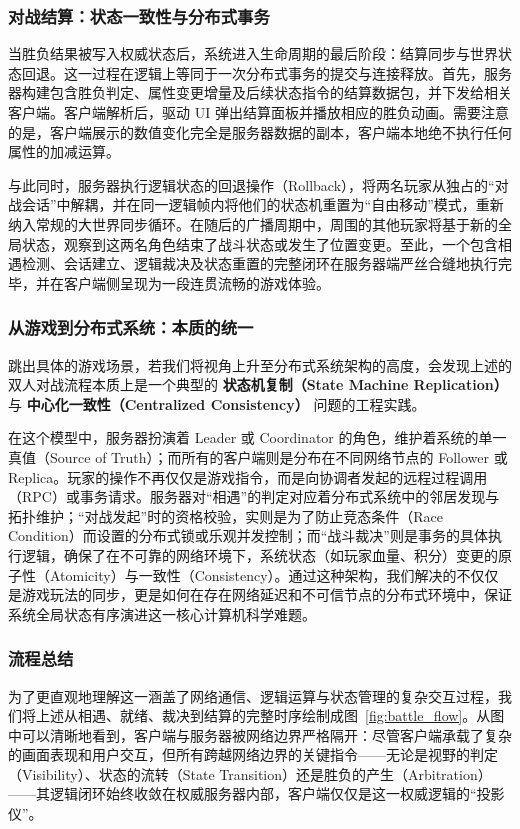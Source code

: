 \subsubsection{对战结算：状态一致性与分布式事务}

当胜负结果被写入权威状态后，系统进入生命周期的最后阶段：结算同步与世界状态回退。这一过程在逻辑上等同于一次分布式事务的提交与连接释放。首先，服务器构建包含胜负判定、属性变更增量及后续状态指令的结算数据包，并下发给相关客户端。客户端解析后，驱动 UI 弹出结算面板并播放相应的胜负动画。需要注意的是，客户端展示的数值变化完全是服务器数据的副本，客户端本地绝不执行任何属性的加减运算。

与此同时，服务器执行逻辑状态的回退操作（Rollback），将两名玩家从独占的“对战会话”中解耦，并在同一逻辑帧内将他们的状态机重置为“自由移动”模式，重新纳入常规的大世界同步循环。在随后的广播周期中，周围的其他玩家将基于新的全局状态，观察到这两名角色结束了战斗状态或发生了位置变更。至此，一个包含相遇检测、会话建立、逻辑裁决及状态重置的完整闭环在服务器端严丝合缝地执行完毕，并在客户端侧呈现为一段连贯流畅的游戏体验。

\subsubsection{从游戏到分布式系统：本质的统一}

跳出具体的游戏场景，若我们将视角上升至分布式系统架构的高度，会发现上述的双人对战流程本质上是一个典型的 \textbf{状态机复制（State Machine Replication）} 与 \textbf{中心化一致性（Centralized Consistency）} 问题的工程实践。

在这个模型中，服务器扮演着 Leader 或 Coordinator 的角色，维护着系统的单一真值（Source of Truth）；而所有的客户端则是分布在不同网络节点的 Follower 或 Replica。玩家的操作不再仅仅是游戏指令，而是向协调者发起的远程过程调用（RPC）或事务请求。服务器对“相遇”的判定对应着分布式系统中的邻居发现与拓扑维护；“对战发起”时的资格校验，实则是为了防止竞态条件（Race Condition）而设置的分布式锁或乐观并发控制；而“战斗裁决”则是事务的具体执行逻辑，确保了在不可靠的网络环境下，系统状态（如玩家血量、积分）变更的原子性（Atomicity）与一致性（Consistency）。通过这种架构，我们解决的不仅仅是游戏玩法的同步，更是如何在存在网络延迟和不可信节点的分布式环境中，保证系统全局状态有序演进这一核心计算机科学难题。

\subsubsection{流程总结}

为了更直观地理解这一涵盖了网络通信、逻辑运算与状态管理的复杂交互过程，我们将上述从相遇、就绪、裁决到结算的完整时序绘制成图~\ref{fig:battle_flow}。从图中可以清晰地看到，客户端与服务器被网络边界严格隔开：尽管客户端承载了复杂的画面表现和用户交互，但所有跨越网络边界的关键指令——无论是视野的判定（Visibility）、状态的流转（State Transition）还是胜负的产生（Arbitration）——其逻辑闭环始终收敛在权威服务器内部，客户端仅仅是这一权威逻辑的“投影仪”。

